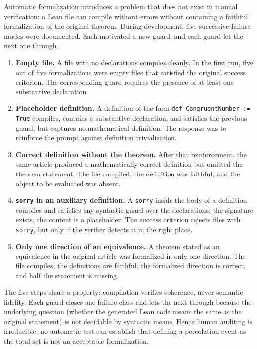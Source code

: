\documentclass[12pt,a4paper]{article}
\theoremstyle{remark}
\begin{document}
Automatic formalization introduces a problem that does not exist in manual verification: a Lean file can compile without errors without containing a faithful formalization of the original theorem. During development, five successive failure modes were documented. Each motivated a new guard, and each guard let the next one through.

\begin{enumerate}
\item \textbf{Empty file.} A file with no declarations compiles cleanly. In the first run, five out of five formalizations were empty files that satisfied the original success criterion. The corresponding guard requires the presence of at least one substantive declaration.

\item \textbf{Placeholder definition.} A definition of the form \texttt{def CongruentNumber := True} compiles, contains a substantive declaration, and satisfies the previous guard, but captures no mathematical definition. The response was to reinforce the prompt against definition trivialization.

\item \textbf{Correct definition without the theorem.} After that reinforcement, the same article produced a mathematically correct definition but omitted the theorem statement. The file compiled, the definition was faithful, and the object to be evaluated was absent.

\item \textbf{\texttt{sorry} in an auxiliary definition.} A \texttt{sorry} inside the body of a definition compiles and satisfies any syntactic guard over the declarations: the signature exists, the content is a placeholder. The success criterion rejects files with \texttt{sorry}, but only if the verifier detects it in the right place.

\item \textbf{Only one direction of an equivalence.} A theorem stated as an equivalence in the original article was formalized in only one direction. The file compiles, the definitions are faithful, the formalized direction is correct, and half the statement is missing.
\end{enumerate}

The five steps share a property: compilation verifies coherence, never semantic fidelity. Each guard closes one failure class and lets the next through because the underlying question (whether the generated Lean code means the same as the original statement) is not decidable by syntactic means. Hence human auditing is irreducible: no automatic test can establish that defining a percolation event as the total set is not an acceptable formalization.
\end{document}
